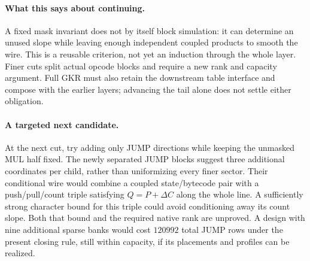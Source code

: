 \paragraph{What this says about continuing.} A fixed mask invariant does not by itself block simulation: it can determine an unused slope while leaving enough independent coupled products to smooth the wire. This is a reusable criterion, not yet an induction through the whole layer. Finer cuts split actual opcode blocks and require a new rank and capacity argument. Full GKR must also retain the downstream table interface and compose with the earlier layers; advancing the tail alone does not settle either obligation.

\paragraph{A targeted next candidate.} At the next cut, try adding only JUMP directions while keeping the unmasked MUL half fixed. The newly separated JUMP blocks suggest three additional coordinates per child, rather than uniformizing every finer sector. Their conditional wire would combine a coupled state/bytecode pair with a push/pull/count triple satisfying $Q=P+\Delta C$ along the whole line. A sufficiently strong character bound for this triple could avoid conditioning away its count slope. Both that bound and the required native rank are unproved. A design with nine additional sparse banks would cost $120992$ total JUMP rows under the present closing rule, still within capacity, if its placements and profiles can be realized.
